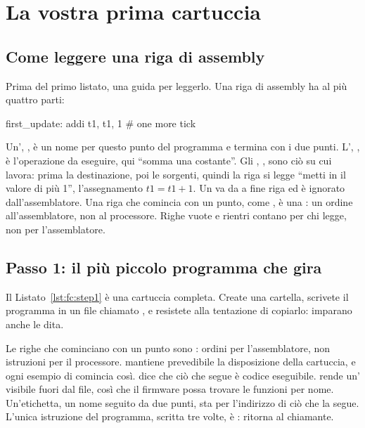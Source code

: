 \section{La vostra prima cartuccia}

\subsection{Come leggere una riga di assembly}

Prima del primo listato, una guida per leggerlo. Una riga di assembly ha al più
quattro parti:

\begin{asm}
first_update:   addi t1, t1, 1      # one more tick
\end{asm}

\noindent Un', , è un nome per questo punto
del programma e termina con i due punti. L', , è
l'operazione da eseguire, qui ``somma una costante''. Gli ,
, sono ciò su cui lavora: prima la destinazione, poi le
sorgenti, quindi la riga si legge ``metti in  il valore di  più
1'', l'assegnamento $t1 = t1 + 1$. Un  va da \code{\#} a fine riga
ed è ignorato dall'assemblatore. Una riga che comincia con un punto, come
, è una : un ordine all'assemblatore, non
al processore. Righe vuote e rientri contano per chi legge, non per
l'assemblatore.

\subsection{Passo 1: il più piccolo programma che gira}

Il Listato~\ref{lst:fc:step1} è una cartuccia completa. Create una cartella,
scrivete il programma in un file chiamato , e
resistete alla tentazione di copiarlo: imparano anche le dita.


Le righe che cominciano con un punto sono : ordini per
l'assemblatore, non istruzioni per il processore. 
mantiene prevedibile la disposizione della cartuccia, e ogni esempio di \prg
comincia così.  dice che ciò che segue è codice
eseguibile.  rende un' visibile fuori dal file,
così che il firmware possa trovare le funzioni per nome. Un'etichetta, un nome
seguito da due punti, sta per l'indirizzo di ciò che la segue. L'unica
istruzione del programma, scritta tre volte, è : ritorna al chiamante.

